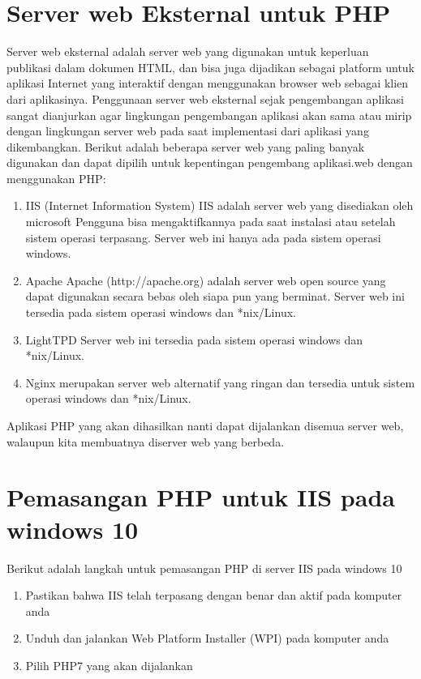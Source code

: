 \section{Server web Eksternal untuk PHP}
Server web eksternal adalah server web yang digunakan untuk keperluan publikasi dalam dokumen HTML, dan bisa juga dijadikan sebagai platform untuk aplikasi Internet yang interaktif dengan menggunakan browser web sebagai klien dari aplikasinya. Penggunaan server web eksternal sejak pengembangan aplikasi sangat dianjurkan agar lingkungan pengembangan aplikasi akan sama atau mirip dengan lingkungan server web pada saat implementasi dari aplikasi yang dikembangkan. Berikut adalah beberapa server web yang paling banyak digunakan dan dapat dipilih untuk kepentingan pengembang aplikasi.web dengan menggunakan PHP:
\begin{enumerate}
\item IIS (Internet Information System)
IIS adalah server web yang disediakan oleh microsoft Pengguna bisa mengaktifkannya pada saat instalasi atau setelah sistem operasi terpasang. Server web ini hanya ada pada sistem operasi windows.

\item Apache
Apache (http://apache.org) adalah server web open source yang dapat digunakan secara bebas oleh siapa pun yang berminat. Server web ini tersedia pada sistem operasi windows dan *nix/Linux.

\item LightTPD
Server web ini tersedia pada sistem operasi windows dan *nix/Linux.
  
\item Nginx
merupakan server web alternatif yang ringan dan tersedia untuk sistem operasi windows dan *nix/Linux.
\end {enumerate}

Aplikasi PHP yang akan dihasilkan nanti dapat dijalankan disemua server web, walaupun kita membuatnya diserver web yang berbeda.


\section{Pemasangan PHP untuk IIS pada windows 10 }
Berikut adalah langkah untuk pemasangan PHP di server IIS pada windows 10
\begin{enumerate}
\item Pastikan bahwa IIS telah terpasang dengan benar dan aktif pada komputer anda
\item Unduh dan jalankan Web Platform Installer (WPI) pada komputer anda
\item Pilih PHP7 yang akan dijalankan
\end{enumerate}

